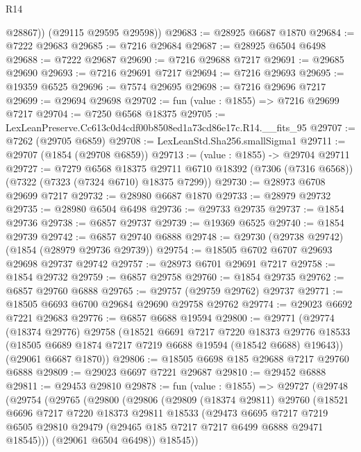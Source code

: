 \begin{lexlean}{R14}
\begin{coremodule}
          @28867))
      (@29115 @29595 @29598))
@29683 := @28925 @6687 @1870
@29684 := @7222 @29683
@29685 := @7216 @29684
@29687 := @28925 @6504 @6498
@29688 := @7222 @29687
@29690 := @7216 @29688 @7217
@29691 := @29685 @29690
@29693 := @7216 @29691 @7217
@29694 := @7216 @29693
@29695 := @19359 @6525
@29696 := @7574 @29695
@29698 := @7216 @29696 @7217
@29699 := @29694 @29698
@29702 := fun (value : @1855) => @7216 @29699 @7217
@29704 := @7250 @6568 @18375
@29705 := LexLeanPreserve.Cc613c0d4cdf00b8508ed1a73cd86e17c.R14.__fits_95
@29707 := @7262 (@29705 @6859)
@29708 := LexLeanStd.Sha256.smallSigma1
@29711 := @29707 (@1854 (@29708 @6859))
@29713 := (value : @1855) -> @29704 @29711
@29727 := @7279
    @6568
    @18375
    @29711
    @6710
    @18392
    (@7306 (@7316 @6568))
    (@7322 (@7323 (@7324 @6710) @18375 @7299))
@29730 := @28973 @6708 @29699 @7217
@29732 := @28980 @6687 @1870
@29733 := @28979 @29732
@29735 := @28980 @6504 @6498
@29736 := @29733 @29735
@29737 := @1854 @29736
@29738 := @6857 @29737
@29739 := @19369 @6525
@29740 := @1854 @29739
@29742 := @6857 @29740 @6888
@29748 := @29730 (@29738 @29742) (@1854 (@28979 @29736 @29739))
@29754 := @18505 @6702 @6707 @29693 @29698 @29737 @29742
@29757 := @28973 @6701 @29691 @7217
@29758 := @1854 @29732
@29759 := @6857 @29758
@29760 := @1854 @29735
@29762 := @6857 @29760 @6888
@29765 := @29757 (@29759 @29762) @29737
@29771 := @18505 @6693 @6700 @29684 @29690 @29758 @29762
@29774 := @29023 @6692 @7221 @29683
@29776 := @6857 @6688 @19594
@29800 := @29771
    (@29774
      (@18374 @29776)
      @29758
      (@18521
        @6691
        @7217
        @7220
        @18373
        @29776
        @18533
        (@18505 @6689 @1874 @7217 @7219 @6688 @19594 (@18542 @6688) @19643))
      (@29061 @6687 @1870))
@29806 := @18505 @6698 @185 @29688 @7217 @29760 @6888
@29809 := @29023 @6697 @7221 @29687
@29810 := @29452 @6888
@29811 := @29453 @29810
@29878 := fun (value : @1855) =>
  @29727
    (@29748
      (@29754
        (@29765
          (@29800
            (@29806
              (@29809
                (@18374 @29811)
                @29760
                (@18521
                  @6696
                  @7217
                  @7220
                  @18373
                  @29811
                  @18533
                  (@29473
                    @6695
                    @7217
                    @7219
                    @6505
                    @29810
                    @29479
                    (@29465 @185 @7217 @7217 @6499 @6888 @29471 @18545)))
                (@29061 @6504 @6498))
              @18545))

\end{coremodule}
\end{lexlean}
